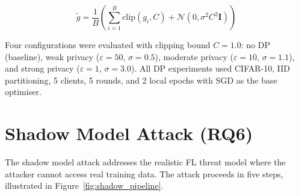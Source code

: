\documentclass[12pt, a4paper]{report}
\begin{document}
\begin{equation}
  \tilde{g} = \frac{1}{B} \left( \sum_{i=1}^{B} \text{clip}(g_i, C)
  + \mathcal{N}(0, \sigma^2 C^2 \mathbf{I}) \right)
\end{equation}

Four configurations were evaluated with clipping bound $C = 1.0$: no DP
(baseline), weak privacy ($\varepsilon = 50$, $\sigma = 0.5$), moderate privacy
($\varepsilon = 10$, $\sigma = 1.1$), and strong privacy ($\varepsilon = 1$,
$\sigma = 3.0$). All DP experiments used CIFAR-10,
IID partitioning, 5 clients, 5 rounds, and 2 local epochs with SGD as the base
optimiser.

\section{Shadow Model Attack (RQ6)}

The shadow model attack addresses the realistic FL threat model where the attacker
cannot access real training data. The attack proceeds in five steps, illustrated
in Figure~\ref{fig:shadow_pipeline}.
\end{document}
